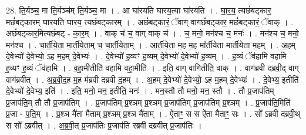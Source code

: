 \documentclass[17pt]{extarticle}
\begin{document}
28. ति॒र्यञ्च॒ मा ति॒र्यञ्च॑म् ति॒र्यञ्च॒ मा । . आ घा॑रयति घारय॒त्या घा॑रयति । . घा॒र॒य॒ त्यछं॑बट्कार॒ मछं॑बट्कारम् घारयति घारय॒ त्यछं॑बट्कारम् । . अछं॑बट्कारं॒ ॅवाग् वागछं॑बट्कार॒ मछं॑बट्कारं॒ ॅवाक् । . अछं॑बट्कार॒मित्यछं॑बट् - का॒र॒म् । . वाक् च॑ च॒ वाग् वाक् च॑ । . च॒ मनो॒ मन॑श्च च॒ मनः॑ । . मन॑श्च च॒ मनो॒ मन॑श्च । . चा॒र्ती॒ये॒ता॒ मा॒र्ती॒ये॒ता॒म् च॒ चा॒र्ती॒ये॒ता॒म् । . आ॒र्ती॒ये॒ता॒ म॒ह म॒ह मा᳚र्तीयेता मार्तीयेता म॒हम् । . अ॒हम् दे॒वेभ्यो॑ दे॒वेभ्यो॒ ऽह म॒हम् दे॒वेभ्यः॑ । . दे॒वेभ्यो॑ ह॒व्यꣳ ह॒व्यम् दे॒वेभ्यो॑ दे॒वेभ्यो॑ ह॒व्यम् । . ह॒व्यं ॅव॑हामि वहामि ह॒व्यꣳ ह॒व्यं ॅव॑हामि । . व॒हा॒मीतीति॑ वहामि वहा॒मीति॑ । . इति॒ वाग् वागितीति॒ वाक् । . वाग॑ब्रवी दब्रवी॒द् वाग् वाग॑ब्रवीत् । . अ॒ब्र॒वी॒द॒ह म॒ह म॑ब्रवी दब्रवी द॒हम् । . अ॒हम् दे॒वेभ्यो॑ दे॒वेभ्यो॒ ऽह म॒हम् दे॒वेभ्यः॑ । . दे॒वेभ्य॒ इतीति॑ दे॒वेभ्यो॑ दे॒वेभ्य॒ इति॑ । . इति॒ मनो॒ मन॒ इतीति॒ मनः॑ । . मन॒स्तौ तौ मनो॒ मन॒ स्तौ । . तौ प्र॒जाप॑तिम् प्र॒जाप॑ति॒म् तौ तौ प्र॒जाप॑तिम् । . प्र॒जाप॑तिम् प्र॒श्ञम् प्र॒श्ञम् प्र॒जाप॑तिम् प्र॒जाप॑तिम् प्र॒श्ञम् । . प्र॒जाप॑ति॒मिति॑ प्र॒जा - प॒ति॒म् । . प्र॒श्ञ मै॑ता मैताम् प्र॒श्ञम् प्र॒श्ञ मै॑ताम् । . ऐ॒ताꣳ॒॒ स स ऐ॑ता मैताꣳ॒॒ सः । . सो᳚ ऽब्रवी दब्रवी॒थ् स सो᳚ ऽब्रवीत् । . अ॒ब्र॒वी॒त् प्र॒जाप॑तिः प्र॒जाप॑ति रब्रवी दब्रवीत् प्र॒जाप॑तिः । \newline
\end{document}
